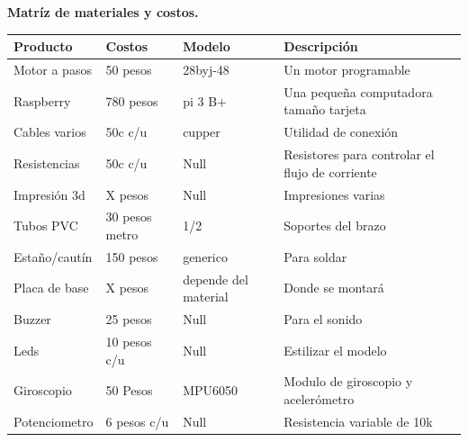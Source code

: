 \documentclass[letterpaper]{article}
\begin{document}
   \begin{large}
       \begin{large}
       \textbf{Matríz de materiales y costos.}
           \begin{table}[htbp]
\begin{tabular}{|l|l|l|l|} 
\hline
Producto      & Costos         & Modelo               & Descripción                            \\ \hline
Motor a pasos & 50 pesos       & 28byj-48             & Un motor programable                   \\ \hline
Raspberry     & 780 pesos      & pi 3 B+              & Una pequeña computadora tamaño tarjeta \\ \hline
Cables varios & 50c c/u        & cupper               & Utilidad de conexión                  \\ \hline
Resistencias  & 50c c/u        & Null                 & Resistores para controlar el flujo de corriente  \\ \hline
Impresión 3d  & X pesos        & Null                 & Impresiones varias                     \\ \hline
Tubos PVC     & 30 pesos metro & 1/2                  & Soportes del brazo                     \\ \hline
Estaño/cautín & 150 pesos      & generico             & Para soldar                            \\ \hline
Placa de base & X pesos        & depende del material & Donde se montará                       \\ \hline
Buzzer        & 25 pesos       & Null                 & Para el sonido                         \\ \hline
Leds          & 10 pesos c/u   & Null                 & Estilizar el modelo                    \\ \hline
Giroscopio    & 50 Pesos       & MPU6050              & Modulo de giroscopio y acelerómetro    \\ \hline
Potenciometro & 6 pesos c/u    & Null                 & Resistencia variable de 10k            \\ \hline
\end{tabular}
\end{table}
       \end{large}
   \end{large}
\\\\
\end{document}

